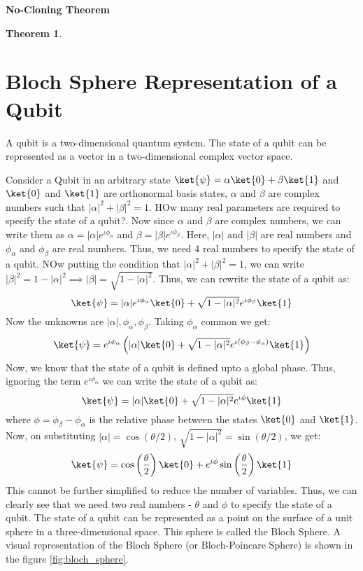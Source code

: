 \documentclass[12pt, oneside]{book}
\newtheorem{theorem}{Theorem}[section]
\theoremstyle{definition}
\theoremstyle{definition}
\theoremstyle{remark}
\begin{document}
\begin{importantnote}
    \textbf{No-Cloning Theorem}
    \begin{theorem}

    \end{theorem}
\end{importantnote}



\section{Bloch Sphere Representation of a Qubit}
A qubit is a two-dimensional quantum system. The state of a qubit can be represented as a vector in a two-dimensional complex vector space.

Consider a Qubit in an arbitrary state $\ket{\psi}=\alpha\ket{0}+\beta\ket{1}$ and $\ket{0}$ and $\ket{1}$ are orthonormal basis states, $\alpha$ and $\beta$ are complex numbers such that $|\alpha|^2+|\beta|^2=1$.
HOw many real parameters are required to specify the state of a qubit?. Now since $\alpha$ and $\beta$ are complex numbers, we can write them as $\alpha=|\alpha|e^{\iota \phi_{\alpha}}$
and $\beta = |\beta| e^{\iota \phi_{\beta}}$. Here, $|\alpha|$ and $|\beta|$ are real numbers and $\phi_{\alpha}$ and $\phi_{\beta}$ are real numbers. Thus, we need 4 real numbers to specify the state of a qubit.
NOw putting the condition that $|\alpha|^2+|\beta|^2=1$, we can write $|\beta|^2=1-|\alpha|^2 \implies |\beta|=\sqrt{1-|\alpha|^2}$.
Thus, we can rewrite the state of a qubit as:
\[ 
    \ket{\psi}=|\alpha|e^{\iota \phi_{\alpha}}\ket{0}+\sqrt{1-|\alpha|^2}e^{\iota \phi_{\beta}}\ket{1}
\]
Now the unknowns are $|\alpha|,\phi_{\alpha},\phi_{\beta}$. Taking $\phi_{\alpha}$ common we get:
\[
    \ket{\psi}=e^{\iota \phi_{\alpha}}\left(|\alpha|\ket{0}+\sqrt{1-|\alpha|^2}e^{\iota(\phi_{\beta}-\phi_{\alpha})}\ket{1}\right)
\]
Now, we know that the state of a qubit is defined upto a global phase. Thus, ignoring the term
$e^{\iota \phi_{\alpha}}$ we can write the state of a qubit as:
\[
    \ket{\psi}=|\alpha|\ket{0}+\sqrt{1-|\alpha|^2}e^{\iota \phi}\ket{1}
\]
where $\phi=\phi_{\beta}-\phi_{\alpha}$ is the relative phase between the states $\ket{0}$ and $\ket{1}$. 
Now, on substituting $|\alpha|=\cos(\theta/2)$, $\sqrt{1-|\alpha|^2}=\sin(\theta/2)$, we get:
\[
    \ket{\psi}=\cos\left(\frac{\theta}{2}\right)\ket{0}+e^{\iota \phi}\sin\left(\frac{\theta}{2}\right)\ket{1}
\]
This cannot be further simplified to reduce the number of variables. Thus, we can clearly see that we need two real numbers - $\theta$ and $\phi$ to specify the state of a qubit.
The state of a qubit can be represented as a point on the surface of a unit sphere in a three-dimensional space. This sphere is called the Bloch Sphere.
A visual representation of the Bloch Sphere (or Bloch-Poincare Sphere) is shown in the figure \ref{fig:bloch_sphere}.
\end{document}
